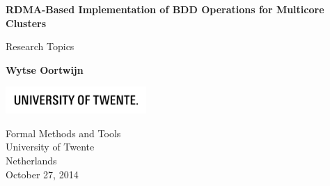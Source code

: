 \begin{titlepage}
    \begin{center}
    \vspace*{1cm}

    \huge
    \textbf{RDMA-Based Implementation of BDD Operations for Multicore Clusters}

    \vspace{0.5cm}
    \LARGE
    Research Topics

    \vspace{1.5cm}

    \Large
    \textbf{Wytse Oortwijn}

    \vfill

    \vspace{0.8cm}

    \includegraphics[width=0.4\textwidth]{images/university.png}

    \large
    Formal Methods and Tools\\
    University of Twente\\
    Netherlands\\
    October 27, 2014
    \end{center}
\end{titlepage}